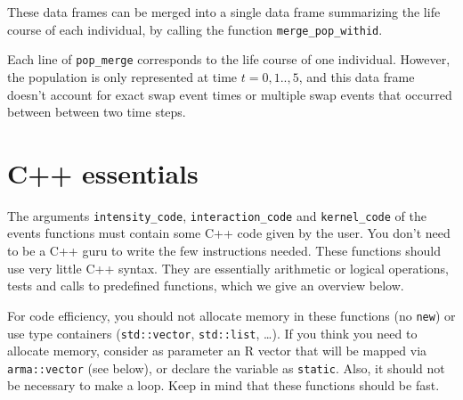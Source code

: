 These data frames can be merged into a single data frame summarizing the life course of each individual, by calling the function \texttt{merge\_pop\_withid}.

\begin{Shaded}
\begin{Highlighting}[]
\StringTok{ }\OperatorTok{$}
\StringTok{ }
\end{Highlighting}
\end{Shaded}

Each line of \texttt{pop\_merge} corresponds to the life course of one individual. However, the population is only represented at time \(t=0,1..,5\), and this data frame doesn't account for exact swap event times or multiple swap events that occurred between between two time steps.

\hypertarget{cppessentials}{%
\section{C++ essentials}\label{cppessentials}}

The arguments \texttt{intensity\_code}, \texttt{interaction\_code} and \texttt{kernel\_code} of the events functions must contain some C++ code given by the user. You don't need to be a C++ guru to write the few instructions needed. These functions should use very little C++ syntax. They are essentially arithmetic or logical operations, tests and calls to predefined functions, which we give an overview below.

For code efficiency, you should not allocate memory in these functions (no \texttt{new}) or use type containers (\texttt{std::vector}, \texttt{std::list}, \ldots). If you think you need to allocate memory, consider as parameter an R vector that will be mapped via \texttt{arma::vector} (see below), or declare the variable as \texttt{static}.
Also, it should not be necessary to make a loop. Keep in mind that these functions should be fast.

